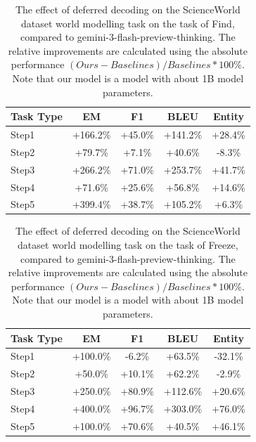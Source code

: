 \begin{table}[h]
\centering
    \setlength\tabcolsep{15pt}
    \setlength\extrarowheight{0pt}
\caption{The effect of deferred decoding on the ScienceWorld dataset \citep{wang-etal-2022-scienceworld} world modelling task on the task of Find, compared to gemini-3-flash-preview-thinking. The relative improvements are calculated using the absolute performance $(Ours - Baselines) / Baselines * 100\%$. Note that our model is a model with about 1B model parameters.}
\label{tab:scienceworld5}
\begin{tabular}{lcccc}
\toprule
\textbf{Task Type} & \textbf{EM} & \textbf{F1}
  & \textbf{BLEU} & \textbf{Entity}\\
\midrule
Step1 & +166.2\% & +45.0\% & +141.2\% & +28.4\% \\
Step2 & +79.7\% & +7.1\% & +40.6\% & -8.3\% \\
Step3 & +266.2\% & +71.0\% & +253.7\% & +41.7\% \\
Step4 & +71.6\% & +25.6\% & +56.8\% & +14.6\% \\
Step5 & +399.4\% & +38.7\% & +105.2\% & +6.3\% \\

\bottomrule
\end{tabular}
\end{table}


\begin{table}[h]
\centering
    \setlength\tabcolsep{15pt}
    \setlength\extrarowheight{0pt}
\caption{The effect of deferred decoding on the ScienceWorld dataset \citep{wang-etal-2022-scienceworld} world modelling task on the task of Freeze, compared to gemini-3-flash-preview-thinking. The relative improvements are calculated using the absolute performance $(Ours - Baselines) / Baselines * 100\%$. Note that our model is a model with about 1B model parameters.}
\label{tab:scienceworld6}
\begin{tabular}{lcccc}
\toprule
\textbf{Task Type} & \textbf{EM} & \textbf{F1}
  & \textbf{BLEU} & \textbf{Entity}\\
\midrule
Step1 & +100.0\% & -6.2\% & +63.5\% & -32.1\% \\
Step2 & +50.0\% & +10.1\% & +62.2\% & -2.9\% \\
Step3 & +250.0\% & +80.9\% & +112.6\% & +20.6\% \\
Step4 & +400.0\% & +96.7\% & +303.0\% & +76.0\% \\
Step5 & +100.0\% & +70.6\% & +40.5\% & +46.1\% \\


\bottomrule
\end{tabular}
\end{table}


